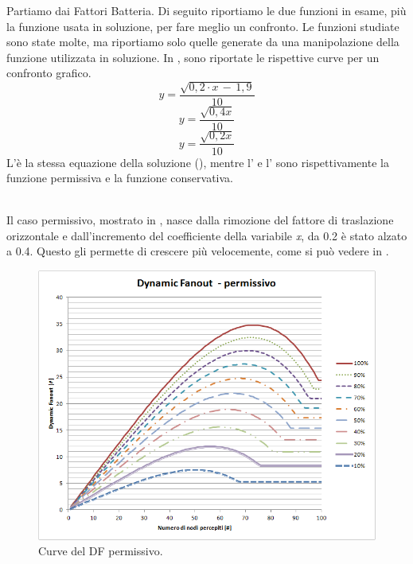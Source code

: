 Partiamo dai Fattori Batteria. Di seguito riportiamo le due funzioni in esame, più la funzione usata in soluzione, per fare meglio un confronto. Le funzioni studiate sono state molte, ma riportiamo solo quelle generate da una manipolazione della funzione utilizzata in soluzione. In , sono riportate le rispettive curve per un confronto grafico.
\begin{equation}
	\label{eq:df_bis_bat_sol}
	y=\dfrac{\sqrt{0,2\cdot x\,-\,1,9}}{10}
\end{equation}
\begin{equation}
	\label{eq:df_bis_bat_perm}
	y=\dfrac{\sqrt{0,4x}}{10}
\end{equation}
\begin{equation}
	\label{eq:df_bis_bat_cons}
	y=\dfrac{\sqrt{0,2x}}{10}
\end{equation}
L'è la stessa equazione della soluzione (), mentre l' e l' sono rispettivamente la funzione permissiva e la funzione conservativa.
\bigskip

\\
Il caso permissivo, mostrato in , nasce dalla rimozione del fattore di traslazione orizzontale e dall'incremento del coefficiente della variabile \textit{x}, da 0.2 è stato alzato a 0.4. Questo gli permette di crescere più velocemente, come si può vedere in .
\medskip
\begin{figure}[t]
	\centering
	\includegraphics[width=0.9\linewidth]{Images/grafici_usati/DF_permissivo_tot_no_arr}
	\caption[Curve del DF permissivo]{Curve del \acs{DF} permissivo.}
	\label{fig:DF_permissivo_tot_no_arr}
\end{figure}

